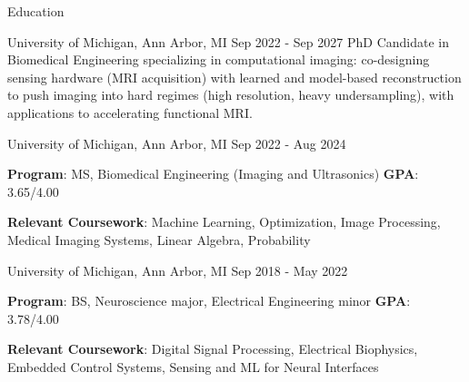 \documentclass{resume}
\begin{document}
\begin{rSection}{Education}
\begin{rSubsection}{University of Michigan}{, Ann Arbor, MI \hfill {Sep 2022 - Sep 2027}}
	PhD Candidate in Biomedical Engineering specializing in computational imaging: co-designing sensing hardware (MRI acquisition) with learned and model-based reconstruction to push imaging into hard regimes (high resolution, heavy undersampling), with applications to accelerating functional MRI.
\end{rSubsection}
\begin{rSubsection}{University of Michigan}{, Ann Arbor, MI \hfill {Sep 2022 - Aug 2024}}
	\item \textbf{Program}: MS, Biomedical Engineering (Imaging and Ultrasonics) \hfill{\textbf{GPA}: 3.65/4.00}
    \item{\textbf{Relevant Coursework}: Machine Learning, Optimization, Image Processing, Medical Imaging Systems, Linear Algebra, Probability}
\end{rSubsection}
\begin{rSubsection}{University of Michigan}{, Ann Arbor, MI \hfill {Sep 2018 - May 2022}}
	\item{\textbf{Program}: BS, Neuroscience major, Electrical Engineering minor} \hfill{\textbf{GPA}: 3.78/4.00}
    \item{\textbf{Relevant Coursework}: Digital Signal Processing, Electrical Biophysics, Embedded Control Systems, Sensing and ML for Neural Interfaces}
\end{rSubsection}
\end{rSection}
\end{document}
